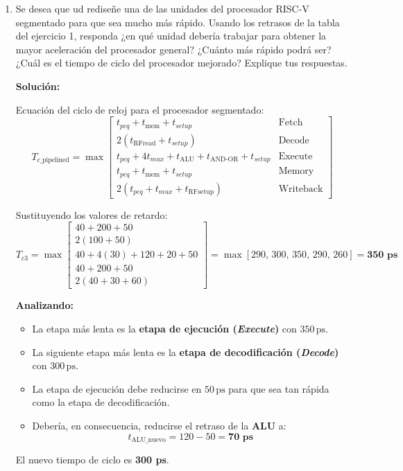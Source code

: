 \documentclass[letterpaper,12pt]{article}
\begin{document}
\begin{enumerate}
{    \[
    \#\text{ instrucciones} = 6
    \]
    \[
    \text{CPI} = \frac{7\text{ ciclos de reloj}}{6\text{ instrucciones}} \approx \mathbf{1{,}17\text{ CPI}}
    \]
    }

    \vspace{0.6cm}

    \pagebreak

    \item Se desea que ud rediseñe una de las unidades del procesador RISC-V segmentado para que sea mucho más rápido. Usando los retrasos de la tabla del ejercicio 1, responda ¿en qué unidad debería trabajar para obtener la mayor aceleración del procesador general? ¿Cuánto más rápido podrá ser? ¿Cuál es el tiempo de ciclo del procesador mejorado? Explique tus respuestas.

    {\color{solcolor}
    \textbf{Solución:}

    Ecuación del ciclo de reloj para el procesador segmentado:
    \[
    T_{c\_\text{pipelined}} = \max
    \left[
    \begin{array}{ll}
        t_{pcq} + t_{\text{mem}} + t_{setup} & \text{Fetch} \\
        2(t_{\text{RFread}} + t_{setup}) & \text{Decode} \\
        t_{pcq} + 4t_{mux} + t_{\text{ALU}} + t_{\text{AND-OR}} + t_{setup} & \text{Execute} \\
        t_{pcq} + t_{\text{mem}} + t_{setup} & \text{Memory} \\
        2(t_{pcq} + t_{mux} + t_{\text{RFsetup}}) & \text{Writeback}
    \end{array}
    \right]
    \]

    Sustituyendo los valores de retardo:
    \[
    T_{c3} = \max
    \left[
    \begin{array}{l}
        40 + 200 + 50 \\
        2(100 + 50) \\
        40 + 4(30) + 120 + 20 + 50 \\
        40 + 200 + 50 \\
        2(40 + 30 + 60)
    \end{array}
    \right]
    = \max [290,\, 300,\, 350,\, 290,\, 260] = \mathbf{350\text{ ps}}
    \]

    \textbf{Analizando:}
    \begin{itemize}
        \item La etapa más lenta es la \textbf{etapa de ejecución (\textit{Execute})} con $350\,\text{ps}$.
        \item La siguiente etapa más lenta es la \textbf{etapa de decodificación (\textit{Decode})} con $300\,\text{ps}$.
        \item La etapa de ejecución debe reducirse en $50\,\text{ps}$ para que sea tan rápida como la etapa de decodificación.
        \item Debería, en consecuencia, reducirse el retraso de la \textbf{ALU} a:
        \[
        t_{\text{ALU\_nuevo}} = 120 - 50 = \mathbf{70\text{ ps}}
        \]
    \end{itemize}
    El nuevo tiempo de ciclo es \textbf{300 ps}.
    }

\end{enumerate}
\end{document}
